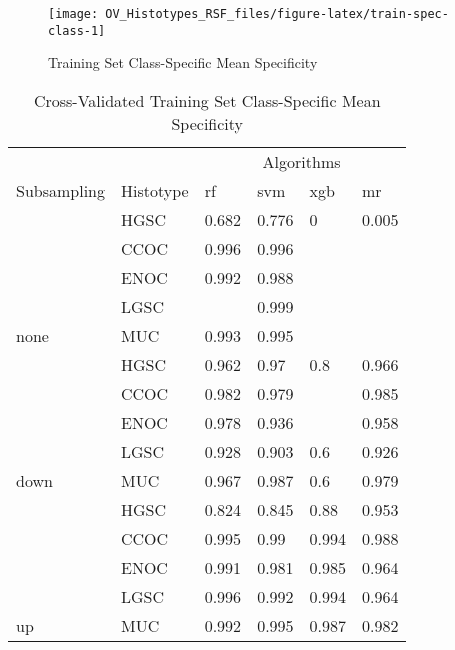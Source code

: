 \documentclass[
]{report}
\begin{document}
\begin{figure}[H]

{\centering \texttt{[image: OV\_Histotypes\_RSF\_files/figure-latex/train-spec-class-1]} 

}

\caption{Training Set Class-Specific Mean Specificity}\label{fig:train-spec-class}
\end{figure}

\begin{table}

\caption{\label{tab:train-spec-class-table}Cross-Validated Training Set Class-Specific Mean Specificity}
\centering
\begin{tabular}[t]{l|l|l|l|l|l}
\hline
\multicolumn{2}{c|}{ } & \multicolumn{4}{c}{Algorithms} \\
\cline{3-6}
Subsampling & Histotype & rf & svm & xgb & mr\\
\hline
 & HGSC & 0.682 & 0.776 & 0 & 0.005\\
\cline{2-6}
 & CCOC & 0.996 & 0.996 & \cellcolor[HTML]{90ee90}{1} & \cellcolor[HTML]{90ee90}{1}\\
\cline{2-6}
 & ENOC & 0.992 & 0.988 & \cellcolor[HTML]{90ee90}{1} & \cellcolor[HTML]{90ee90}{1}\\
\cline{2-6}
 & LGSC & \cellcolor[HTML]{90ee90}{1} & 0.999 & \cellcolor[HTML]{90ee90}{1} & \cellcolor[HTML]{90ee90}{1}\\
\cline{2-6}
\multirow{-5}{*}{\raggedright\arraybackslash none} & MUC & 0.993 & 0.995 & \cellcolor[HTML]{90ee90}{1} & \cellcolor[HTML]{90ee90}{1}\\
\cline{1-6}
 & HGSC & 0.962 & 0.97 & 0.8 & 0.966\\
\cline{2-6}
 & CCOC & 0.982 & 0.979 & \cellcolor[HTML]{90ee90}{1} & 0.985\\
\cline{2-6}
 & ENOC & 0.978 & 0.936 & \cellcolor[HTML]{90ee90}{1} & 0.958\\
\cline{2-6}
 & LGSC & 0.928 & 0.903 & 0.6 & 0.926\\
\cline{2-6}
\multirow{-5}{*}{\raggedright\arraybackslash down} & MUC & 0.967 & 0.987 & 0.6 & 0.979\\
\cline{1-6}
 & HGSC & 0.824 & 0.845 & 0.88 & 0.953\\
\cline{2-6}
 & CCOC & 0.995 & 0.99 & 0.994 & 0.988\\
\cline{2-6}
 & ENOC & 0.991 & 0.981 & 0.985 & 0.964\\
\cline{2-6}
 & LGSC & 0.996 & 0.992 & 0.994 & 0.964\\
\cline{2-6}
\multirow{-5}{*}{\raggedright\arraybackslash up} & MUC & 0.992 & 0.995 & 0.987 & 0.982\\

\end{tabular}
\end{table}
\end{document}
